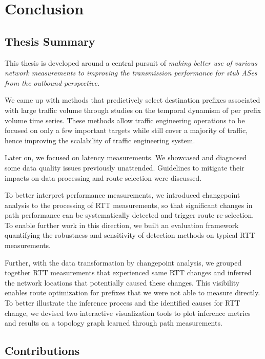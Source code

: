 \chapter{Conclusion}

\section{Thesis Summary}

This thesis is developed around a central pursuit of \textit{making better use of various network measurements to improving the transmission performance for stub ASes from the outbound perspective.}

We came up with methods that predictively select destination prefixes associated with large traffic volume through studies on the temporal dynamism of per prefix volume time series.
These methods allow traffic engineering operations to be focused on only a few important targets while still cover a majority of traffic, hence improving the scalability of traffic engineering system.

Later on, we focused on latency measurements. 
We showcased and diagnosed some data quality issues previously unattended.
Guidelines to mitigate their impacts on data processing and route selection were discussed.

To better interpret performance measurements, we introduced changepoint analysis to the processing of RTT measurements, so that significant changes in path performance can be systematically detected and trigger route re-selection.
To enable further work in this direction, we built an evaluation framework quantifying the robustness and sensitivity of detection methods on typical RTT measurements.

Further, with the data transformation by changepoint analysis, we grouped together RTT measurements that experienced same RTT changes and inferred the network locations that potentially caused these changes. This visibility enables route optimization for prefixes that we were not able to measure directly.
To better illustrate the inference process and the identified causes for RTT change, we devised two interactive visualization tools to plot inference metrics and results on a topology graph learned through path measurements.

\section{Contributions}

